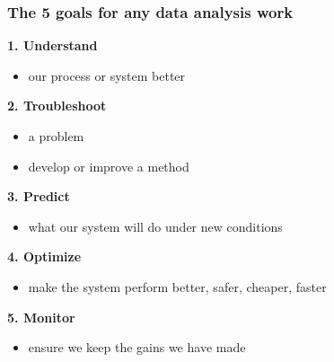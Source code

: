 \documentclass[handout,11pt,aspectratio=169,mathserif]{beamer}
\begin{document}
\begin{frame}\frametitle{The 5 goals for any data analysis work}

	\textbf{{\color{purple} 1. Understand}}
	\begin{itemize}
		\item	our process or system better
	\end{itemize}

	\vspace{12pt}
	\textbf{{\color{purple} 2. Troubleshoot}}
	\begin{itemize}
		\item	a problem
		\item	develop or improve a method
	\end{itemize}

	\vspace{12pt}
	\textbf{{\color{purple} 3. Predict}}
	\begin{itemize}
		\item	what our system will do under new conditions
	\end{itemize}

	\vspace{12pt}
	\textbf{{\color{purple} 4. Optimize}}
	\begin{itemize}
		\item	make the system perform better, safer, cheaper, faster
	\end{itemize}

	\vspace{12pt}
	\textbf{{\color{purple} 5. Monitor}}
		\begin{itemize}
			\item	ensure we keep the gains we have made
		\end{itemize}

\end{frame}
\end{document}

